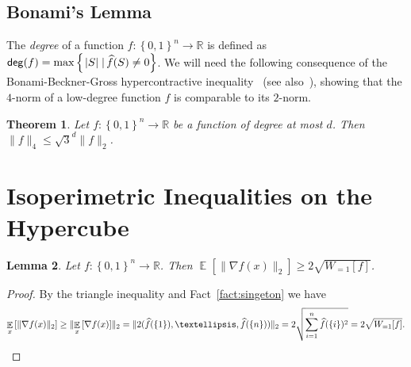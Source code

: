 \documentclass[10pt]{article}
\newcommand{\card}[1]{\left\lvert #1\right\rvert}
\newcommand{\set}[1]{{\left\{#1\right\}}}
\newcommand{\sett}[2]{\left\{\left. #1\;\right\vert #2\right\}}
\newcommand{\Expect}[2]{{\mathop{\mathbb E}_{#1}\left[#2\right]}}
\newcommand{\norm}[1]{\lVert #1\rVert}
\newcommand{\power}[1]{\set{0,1}^{#1}}
\newtheorem{thm}{Theorem}[section]
\newtheorem{lemma}[thm]{Lemma}
\begin{document}
\subsection{Bonami's Lemma}
The \emph{degree} of a function $f\colon \power{n}\to\mathbb{R}$ is defined as
${\sf deg}(f) = \max\sett{\card{S}}{\widehat{f}(S)\neq 0}$.
We will need the following consequence of
the Bonami-Beckner-Gross hypercontractive inequality~\cite{Bec75,Bonami,grossLogSob} (see also~\cite{ODonnell}), showing that the $4$-norm of a low-degree function $f$ is comparable to its $2$-norm.
\begin{thm}\label{thm:hypercontractivity}
  Let $f\colon\power{n}\to\mathbb{R}$ be a function of degree at most $d$. Then
  $\norm{f}_4\leq \sqrt{3}^d\norm{f}_2$.
\end{thm}

\section{Isoperimetric Inequalities on the Hypercube}\label{sec:classic_iso}
\setcounter{equation}{1}
\begin{lemma}\label{lemma:tal_lvl1}
  Let $f\colon\power{n}\to\mathbb{R}$. Then
  $\Expect{}{\norm{\nabla f(x)}_2 }\geq 2\sqrt{W_{=1}[f]}$.
\end{lemma}
\begin{proof}
By the triangle inequality and Fact~\ref{fact:singeton} we have
  \[
  \Expect{x}{\norm{\nabla f(x)}_2 }
  \geq \norm{\Expect{x}{\nabla f(x)}}_2
  = \norm{2(\widehat{f}(\set{1}),\ldots,\widehat{f}(\set{n}))}_2
  = 2\sqrt{\sum\limits_{i=1}^{n}\widehat{f}(\set{i})^2}
  = 2\sqrt{W_{=1}[f]}.
  \qedhere
 \]
\end{proof}
\end{document}
